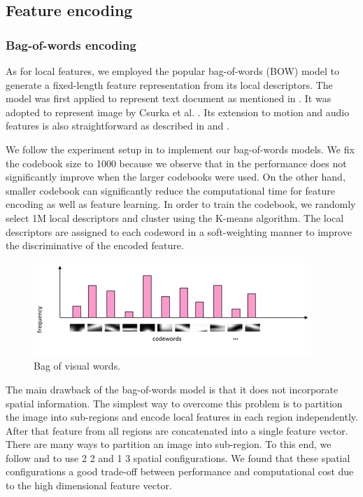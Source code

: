 \documentclass[twocolumn]{bmcart}%
\begin{document}
\subsection{Feature encoding}
\label{feature_encoding}
\subsubsection{Bag-of-words encoding}

As for local features, we employed the popular bag-of-words (BOW) model to generate a fixed-length feature representation from its local descriptors. The model was first applied to represent text document as mentioned in \cite{harris1954distributional}. It was adopted to represent image by Csurka et al. \cite{csurka2004visual}. Its extension to motion and audio features is also straightforward as described in \cite{sivic2009efficient} and \cite{jiang2010columbia}. 

We follow the experiment setup in \cite{jiang2010representations} to implement our bag-of-words models. We fix the codebook size to 1000 because we observe that in \cite{jiang2010representations} the performance does not significantly improve when the larger codebooks were used. On the other hand, smaller codebook can significantly reduce the computational time for feature encoding as well as feature learning. In order to train the codebook, we randomly select 1M local descriptors and cluster using the K-means algorithm. The local descriptors are assigned to each codeword in a soft-weighting manner \cite{jiang2007towards} to improve the discriminative of the encoded feature.
\begin{figure}[!h]
	\centering
	\includegraphics[width=1\linewidth]{Images/Bow.png}
	\caption{Bag of visual words.}
	\label{fig:bow}
\end{figure}

The main drawback of the bag-of-words model is that it does not incorporate spatial information. The simplest way to overcome this problem is to partition the image into sub-regions and encode local features in each region independently. After that feature from all regions are concatenated into a single feature vector. There are many ways to partition an image into sub-region. To this end, we follow \cite{jiang2010representations} and \cite{lazebnik2006beyond} to use 2  2 and 1  3 spatial configurations. We found that these spatial configurations a good trade-off between performance and computational cost due to the high dimensional feature vector.
\end{document}
